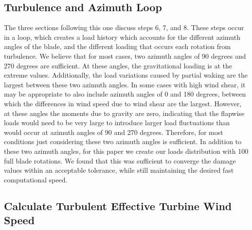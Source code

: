 \documentclass[11pt,letterpaper]{article}
\begin{document}
\subsection{Turbulence and Azimuth Loop}

The three sections following this one discuss steps 6, 7, and 8. These steps occur in a loop, which creates a load history which accounts for the different azimuth angles of the blade, and the different loading that occurs each rotation from turbulence. We believe that for most cases, two azimuth angles of 90 degrees and 270 degrees are sufficient. At these angles, the gravitational loading is at the extreme values. Additionally, the load variations caused by partial waking are the largest between these two azimuth angles. In some cases with high wind shear, it may be appropriate to also include azimuth angles of 0 and 180 degrees, between which the differences in wind speed due to wind shear are the largest. However, at these angles the moments due to gravity are zero, indicating that the flapwise loads would need to be very large to introduce larger load fluctuations than would occur at azimuth angles of 90 and 270 degrees. Therefore, for most conditions just considering these two azimuth angles is sufficient. In addition to these two azimuth angles, for this paper we create our loads distribution with 100 full blade rotations. We found that this was sufficient to converge the damage values within an acceptable tolerance, while still maintaining the desired fast computational speed.

\subsection{Calculate Turbulent Effective Turbine Wind Speed}
\end{document}
